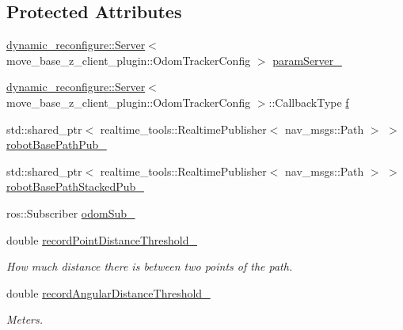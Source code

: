 \subsection*{Protected Attributes}
\begin{DoxyCompactItemize}
\item 
\hyperlink{strikes__back_2servers_2led__action__server_2src_2led__action__server__node_8cpp_a2036ae39d23f8e14a2cc8ddcd46dea5a}{dynamic\+\_\+reconfigure\+::\+Server}$<$ move\+\_\+base\+\_\+z\+\_\+client\+\_\+plugin\+::\+Odom\+Tracker\+Config $>$ \hyperlink{classcl__move__base__z_1_1odom__tracker_1_1OdomTracker_a8bee0a1a49b5f736a7d7a741e56f7b02}{param\+Server\+\_\+}
\item 
\hyperlink{strikes__back_2servers_2led__action__server_2src_2led__action__server__node_8cpp_a2036ae39d23f8e14a2cc8ddcd46dea5a}{dynamic\+\_\+reconfigure\+::\+Server}$<$ move\+\_\+base\+\_\+z\+\_\+client\+\_\+plugin\+::\+Odom\+Tracker\+Config $>$\+::Callback\+Type \hyperlink{classcl__move__base__z_1_1odom__tracker_1_1OdomTracker_a391e33cf5482697b32665fcc7c4d87e4}{f}
\item 
std\+::shared\+\_\+ptr$<$ realtime\+\_\+tools\+::\+Realtime\+Publisher$<$ nav\+\_\+msgs\+::\+Path $>$ $>$ \hyperlink{classcl__move__base__z_1_1odom__tracker_1_1OdomTracker_a40a7cbb6bb6595e250e7c685c781613b}{robot\+Base\+Path\+Pub\+\_\+}
\item 
std\+::shared\+\_\+ptr$<$ realtime\+\_\+tools\+::\+Realtime\+Publisher$<$ nav\+\_\+msgs\+::\+Path $>$ $>$ \hyperlink{classcl__move__base__z_1_1odom__tracker_1_1OdomTracker_a7a2fb23e835ba7d63e69c8db819be876}{robot\+Base\+Path\+Stacked\+Pub\+\_\+}
\item 
ros\+::\+Subscriber \hyperlink{classcl__move__base__z_1_1odom__tracker_1_1OdomTracker_ab55df0e91246e43dff80912dc35a4fee}{odom\+Sub\+\_\+}
\item 
double \hyperlink{classcl__move__base__z_1_1odom__tracker_1_1OdomTracker_a3a1173716d527bd182d04656491e01dd}{record\+Point\+Distance\+Threshold\+\_\+}
\begin{DoxyCompactList}\small\item\em How much distance there is between two points of the path. \end{DoxyCompactList}\item 
double \hyperlink{classcl__move__base__z_1_1odom__tracker_1_1OdomTracker_a1274fe5334c109cd9c2339beb9411441}{record\+Angular\+Distance\+Threshold\+\_\+}
\begin{DoxyCompactList}\small\item\em Meters. \end{DoxyCompactList}\item 

\end{DoxyCompactItemize}
